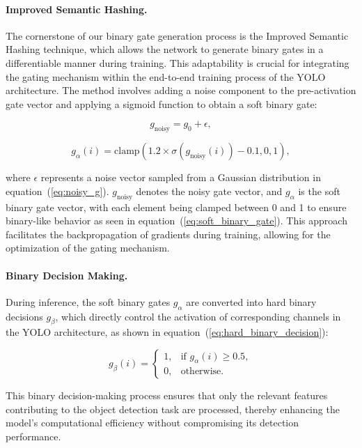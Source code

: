 \paragraph{Improved Semantic Hashing.} The cornerstone of our binary gate generation process is the Improved Semantic Hashing technique, which allows the network to generate binary gates in a differentiable manner during training. This adaptability is crucial for integrating the gating mechanism within the end-to-end training process of the YOLO architecture. The method involves adding a noise component to the pre-activation gate vector and applying a sigmoid function to obtain a soft binary gate:

\begin{equation}
g_{\text{noisy}} = g_0 + \epsilon,
\label{eq:noisy_g}
\end{equation}

\begin{equation}
g_{\alpha}(i) = \text{clamp}(1.2 \times \sigma(g_{\text{noisy}}(i)) - 0.1, 0, 1),
\label{eq:soft_binary_gate}
\end{equation}

where \(\epsilon\) represents a noise vector sampled from a Gaussian distribution in equation~(\ref{eq:noisy_g}). \(g_{\text{noisy}}\) denotes the noisy gate vector, and \(g_{\alpha}\) is the soft binary gate vector, with each element being clamped between 0 and 1 to ensure binary-like behavior as seen in equation~(\ref{eq:soft_binary_gate}). This approach facilitates the backpropagation of gradients during training, allowing for the optimization of the gating mechanism.

\paragraph{Binary Decision Making.} During inference, the soft binary gates \(g_{\alpha}\) are converted into hard binary decisions \(g_{\beta}\), which directly control the activation of corresponding channels in the YOLO architecture, as shown in equation~(\ref{eq:hard_binary_decision}):

\begin{equation}
g_{\beta}(i) = 
\begin{cases}
1, & \text{if } g_{\alpha}(i) \geq 0.5,\\
0, & \text{otherwise}.
\end{cases}
\label{eq:hard_binary_decision}
\end{equation}

This binary decision-making process ensures that only the relevant features contributing to the object detection task are processed, thereby enhancing the model's computational efficiency without compromising its detection performance.

